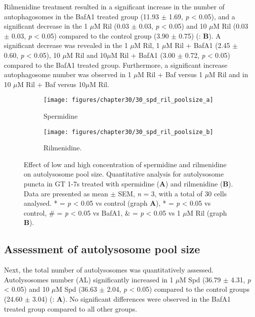 {Rilmenidine treatment resulted in a significant increase in the number of autophagosomes in the BafA1 treated group (11.93 $\pm$ 1.69, \textit{p} < 0.05), and a significant decrease in the 1 $\mu$M Ril (0.03 $\pm$ 0.03, \textit{p} < 0.05) and 10 $\mu$M Ril (0.03 $\pm$ 0.03, \textit{p} < 0.05) compared to the control group (3.90 $\pm$ 0.75) (: \textbf{B}). A significant decrease was revealed in the 1 $\mu$M Ril, 1 $\mu$M Ril + BafA1 (2.45 $\pm$ 0.60, \textit{p} < 0.05), 10 $\mu$M Ril and 10$\mu$M Ril + BafA1 (3.00 $\pm$ 0.72, \textit{p} < 0.05) compared to the BafA1 treated group. Furthermore, a significant increase autophagosome number was observed in 1 $\mu$M Ril + Baf versus 1 $\mu$M Ril and in 10 $\mu$M Ril + Baf versus 10$\mu$M Ril.

\begin{figure}[!htbp]
  \begin{subfigure}[b]{0.495\linewidth}
    \texttt{[image: figures/chapter30/30\_spd\_ril\_poolsize\_a]}
    \caption{Spermidine}
  \end{subfigure}
  \begin{subfigure}[b]{0.495\linewidth}
    \texttt{[image: figures/chapter30/30\_spd\_ril\_poolsize\_b]}
    \caption{Rilmenidine.}
  \end{subfigure}
  \caption[Effect of low and high concentration of spermidine and rilmenidine on autolysosome pool size]{Effect of low and high concentration of spermidine and rilmenidine on autolysosome pool size. Quantitative analysis for autolysosome puncta in GT 1-7s treated with spermidine (\textbf{A}) and rilmenidine (\textbf{B}). Data are presented as mean $\pm$ SEM, \textit{n} = 3, with a total of 30 cells analysed. * = \textit{p} < 0.05 vs control (graph \textbf{A}), * = \textit{p} < 0.05 vs control, \# = \textit{p} < 0.05 vs BafA1, \& = \textit{p} < 0.05 vs 1 $\mu$M Ril (graph \textbf{B}).}
  \label{fig:30_spd_ril_poolsize1}
\end{figure}

\subsection{Assessment of autolysosome pool size}
Next, the total number of autolysosomes was quantitatively assessed.  Autolysosomes number (AL) significantly increased in 1 $\mu$M Spd (36.79 $\pm$ 4.31, \textit{p} < 0.05) and 10 $\mu$M Spd (36.63 $\pm$ 2.04, \textit{p} < 0.05) compared to the control groups (24.60 $\pm$ 3.04) (: \textbf{A}). No significant differences were observed in the BafA1 treated group compared to all other groups.

}
